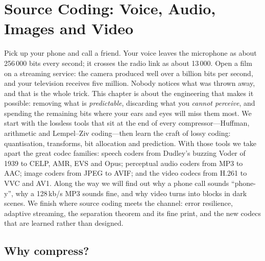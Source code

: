 \chapter{Source Coding: Voice, Audio, Images and Video}
\label{ch:sourcecoding}

\begin{chapterintro}
Pick up your phone and call a friend. Your voice leaves the microphone as about 256\,000 bits
every second; it crosses the radio link as about 13\,000. Open a film on a streaming service: the
camera produced well over a billion bits per second, and your television receives five million.
Nobody notices what was thrown away, and that is the whole trick. This chapter is about the
engineering that makes it possible: removing what is \emph{predictable}, discarding what you
\emph{cannot perceive}, and spending the remaining bits where your ears and eyes will miss them
most. We start with the lossless tools that sit at the end of every compressor---Huffman,
arithmetic and Lempel--Ziv coding---then learn the craft of lossy coding: quantisation,
transforms, bit allocation and prediction. With those tools we take apart the great codec
families: speech coders from Dudley's buzzing Voder of 1939 to CELP, AMR, EVS and Opus;
perceptual audio coders from MP3 to AAC; image coders from JPEG to AVIF; and the video codecs from
H.261 to VVC and AV1. Along the way we will find out why a phone call sounds ``phone-y'', why
a 128\,kb/s MP3 sounds fine, and why video turns into blocks in dark scenes. We finish where
source coding meets the channel: error resilience, adaptive streaming, the separation theorem and
its fine print, and the new codecs that are learned rather than designed.
\end{chapterintro}


\section{Why compress?}
\label{sec:ch16:why}

